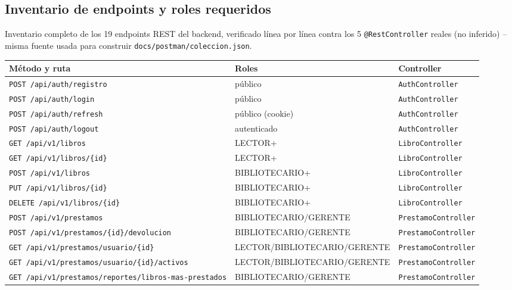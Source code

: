 \documentclass[12pt,a4paper]{article}
\begin{document}
\subsection{Inventario de endpoints y roles requeridos}

Inventario completo de los 19 endpoints REST del backend, verificado
línea por línea contra los 5 \texttt{@RestController} reales (no
inferido) -- misma fuente usada para construir
\texttt{docs/postman/coleccion.json}.

\begin{center}
\small
\begin{longtable}{|l|l|l|}
\hline
\rowcolor{verdeuteq}
\color{white}\textbf{Método y ruta} & \color{white}\textbf{Roles} & \color{white}\textbf{Controller} \\
\hline
\endhead
\texttt{POST /api/auth/registro} & público & \texttt{AuthController} \\ \hline
\texttt{POST /api/auth/login} & público & \texttt{AuthController} \\ \hline
\texttt{POST /api/auth/refresh} & público (cookie) & \texttt{AuthController} \\ \hline
\texttt{POST /api/auth/logout} & autenticado & \texttt{AuthController} \\ \hline
\texttt{GET /api/v1/libros} & LECTOR+ & \texttt{LibroController} \\ \hline
\texttt{GET /api/v1/libros/\{id\}} & LECTOR+ & \texttt{LibroController} \\ \hline
\texttt{POST /api/v1/libros} & BIBLIOTECARIO+ & \texttt{LibroController} \\ \hline
\texttt{PUT /api/v1/libros/\{id\}} & BIBLIOTECARIO+ & \texttt{LibroController} \\ \hline
\texttt{DELETE /api/v1/libros/\{id\}} & BIBLIOTECARIO+ & \texttt{LibroController} \\ \hline
\texttt{POST /api/v1/prestamos} & BIBLIOTECARIO/GERENTE & \texttt{PrestamoController} \\ \hline
\texttt{POST /api/v1/prestamos/\{id\}/devolucion} & BIBLIOTECARIO/GERENTE & \texttt{PrestamoController} \\ \hline
\texttt{GET /api/v1/prestamos/usuario/\{id\}} & LECTOR/BIBLIOTECARIO/GERENTE & \texttt{PrestamoController} \\ \hline
\texttt{GET /api/v1/prestamos/usuario/\{id\}/activos} & LECTOR/BIBLIOTECARIO/GERENTE & \texttt{PrestamoController} \\ \hline
\texttt{GET /api/v1/prestamos/reportes/libros-mas-prestados} & BIBLIOTECARIO/GERENTE & \texttt{PrestamoController} \\ \hline

\end{longtable}
\end{center}
\end{document}
